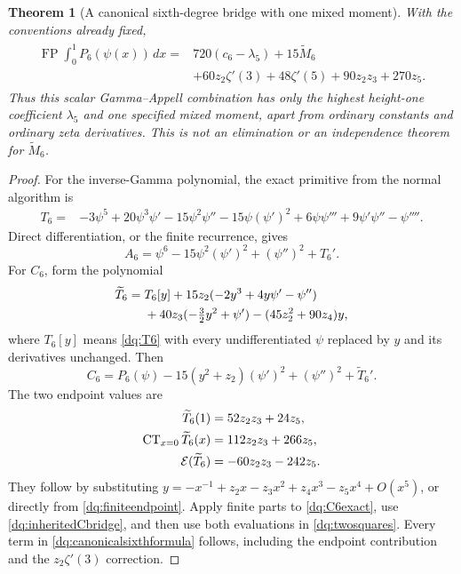 \documentclass[11pt,a4paper]{article}
\numberwithin{equation}{section}
\theoremstyle{plain}
\newtheorem{theorem}{Theorem}[section]
\theoremstyle{definition}
\theoremstyle{remark}
\begin{document}
\begin{theorem}[A canonical sixth-degree bridge with one mixed moment]
\label{dq:canonicalsixth}
With the conventions already fixed,
\begin{align}
 \boxed{\begin{aligned}
 \operatorname{FP}\int_0^1P_6(\psi(x))\,dx
 ={}&720(c_6-\lambda_5)+15\widetilde M_6\\
 &+60z_2\zeta'(3)+48\zeta'(5)+90z_2z_3+270z_5.
 \end{aligned}}
 \label{dq:canonicalsixthformula}
\end{align}
Thus this scalar Gamma--Appell combination has only the highest
height-one coefficient $\lambda_5$ and one specified mixed moment,
apart from ordinary constants and ordinary zeta derivatives. This is
not an elimination or an independence theorem for $\widetilde M_6$.
\end{theorem}

\begin{proof}
For the inverse-Gamma polynomial, the exact primitive from the normal
algorithm is
\begin{align}
 T_6={}&-3\psi^5+20\psi^3\psi'-15\psi^2\psi''
       -15\psi(\psi')^2+6\psi\psi'''+9\psi'\psi''-\psi''''.
 \label{dq:T6}
\end{align}
Direct differentiation, or the finite recurrence, gives
\[
 A_6=\psi^6-15\psi^2(\psi')^2+(\psi'')^2+T_6'.
\]
For $C_6$, form the polynomial
\begin{align}
 \widetilde T_6={}&T_6[y]
  +15z_2(-2y^3+4y\psi'-\psi'')\notag\\
  &+40z_3(-\tfrac32y^2+\psi')-(45z_2^2+90z_4)y,
 \label{dq:TC6}
\end{align}
where $T_6[y]$ means \eqref{dq:T6} with every undifferentiated
$\psi$ replaced by $y$ and its derivatives unchanged. Then
\begin{equation}\label{dq:C6exact}
 C_6=P_6(\psi)-15(y^2+z_2)(\psi')^2+(\psi'')^2
                              +\widetilde T_6'.
\end{equation}
The two endpoint values are
\begin{align}
 \widetilde T_6(1)&=52z_2z_3+24z_5,\notag\\
 \operatorname{CT}_{x=0}\widetilde T_6(x)
                  &=112z_2z_3+266z_5,\notag\\
 \mathcal E(\widetilde T_6)&=-60z_2z_3-242z_5.
 \label{dq:C6endpoints}
\end{align}
They follow by substituting
$y=-x^{-1}+z_2x-z_3x^2+z_4x^3-z_5x^4+O(x^5)$,
or directly from \eqref{dq:finiteendpoint}. Apply finite parts to
\eqref{dq:C6exact}, use \eqref{dq:inheritedCbridge}, and then use
both evaluations in \eqref{dq:twosquares}. Every term in
\eqref{dq:canonicalsixthformula} follows, including the endpoint
contribution and the $z_2\zeta'(3)$ correction.
\end{proof}
\end{document}
